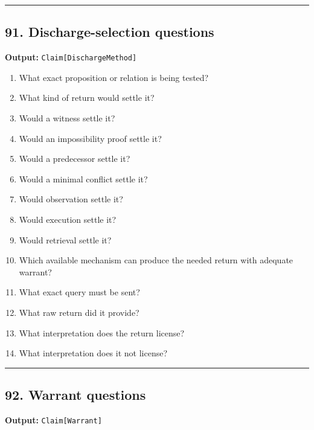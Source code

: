 \documentclass[
]{article}
\providecommand{\tightlist}{%
  \setlength{\itemsep}{0pt}\setlength{\parskip}{0pt}}
\begin{document}
\begin{center}\rule{0.5\linewidth}{0.5pt}\end{center}

\subsection{91. Discharge-selection
questions}\label{discharge-selection-questions}

\textbf{Output:} \texttt{Claim{[}DischargeMethod{]}}

\begin{enumerate}
\def\labelenumi{\arabic{enumi}.}
\tightlist
\item
  What exact proposition or relation is being tested?
\item
  What kind of return would settle it?
\item
  Would a witness settle it?
\item
  Would an impossibility proof settle it?
\item
  Would a predecessor settle it?
\item
  Would a minimal conflict settle it?
\item
  Would observation settle it?
\item
  Would execution settle it?
\item
  Would retrieval settle it?
\item
  Which available mechanism can produce the needed return with adequate
  warrant?
\item
  What exact query must be sent?
\item
  What raw return did it provide?
\item
  What interpretation does the return license?
\item
  What interpretation does it not license?
\end{enumerate}

\begin{center}\rule{0.5\linewidth}{0.5pt}\end{center}

\subsection{92. Warrant questions}\label{warrant-questions}

\textbf{Output:} \texttt{Claim{[}Warrant{]}}
\end{document}
